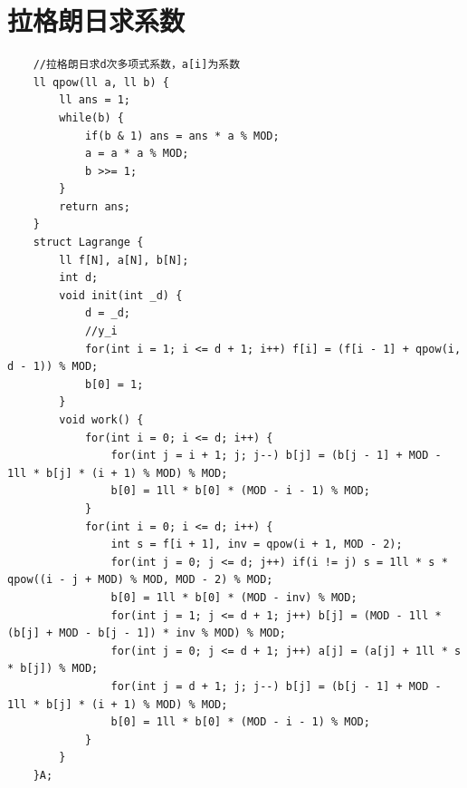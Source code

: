 \documentclass[a4paper,11pt,twoside,fontset = fandol,UTF8]{ctexbook} %
\begin{document}
	\section{拉格朗日求系数}
	\begin{lstlisting}
	//拉格朗日求d次多项式系数，a[i]为系数 
	ll qpow(ll a, ll b) {
	    ll ans = 1;
	    while(b) {
	        if(b & 1) ans = ans * a % MOD;
	        a = a * a % MOD;
	        b >>= 1;   
	    }
	    return ans;   
	}
	struct Lagrange {
	    ll f[N], a[N], b[N];
	    int d;
	    void init(int _d) {
	        d = _d;
	        //y_i
	        for(int i = 1; i <= d + 1; i++) f[i] = (f[i - 1] + qpow(i, d - 1)) % MOD; 
	        b[0] = 1;
	    }
	    void work() {
	        for(int i = 0; i <= d; i++) {
	            for(int j = i + 1; j; j--) b[j] = (b[j - 1] + MOD - 1ll * b[j] * (i + 1) % MOD) % MOD;
	            b[0] = 1ll * b[0] * (MOD - i - 1) % MOD;
	        }
	        for(int i = 0; i <= d; i++) {
	            int s = f[i + 1], inv = qpow(i + 1, MOD - 2);
	            for(int j = 0; j <= d; j++) if(i != j) s = 1ll * s * qpow((i - j + MOD) % MOD, MOD - 2) % MOD;
	            b[0] = 1ll * b[0] * (MOD - inv) % MOD;
	            for(int j = 1; j <= d + 1; j++) b[j] = (MOD - 1ll * (b[j] + MOD - b[j - 1]) * inv % MOD) % MOD;
	            for(int j = 0; j <= d + 1; j++) a[j] = (a[j] + 1ll * s * b[j]) % MOD;
	            for(int j = d + 1; j; j--) b[j] = (b[j - 1] + MOD - 1ll * b[j] * (i + 1) % MOD) % MOD;
	            b[0] = 1ll * b[0] * (MOD - i - 1) % MOD;
	        }   
	    }
	}A;
	\end{lstlisting}
	
\end{document}
